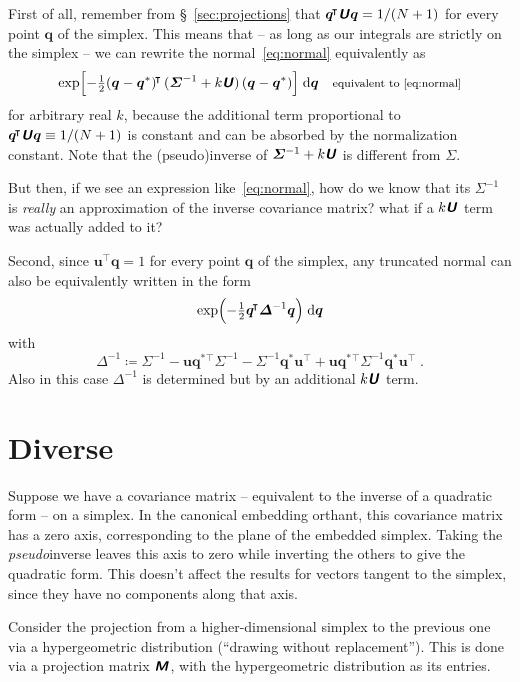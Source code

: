 \documentclass[\ifafour a4paper,12pt,\else a5paper,10pt,\fi%
onecolumn,oneside,article,%
british%
]{memoir}
\theoremstyle{remark}
\theoremstyle{innote}
\newcommand*{\mathte}[1]{\textbf{\textit{\textsf{#1}}}}
\newcommand*{\di}{\mathrm{d}}%
\newcommand*{\defd}{\coloneqq}
\renewcommand*{\|}[1][]{\nonscript\,#1\vert\nonscript\;\mathopen{}}
\newcommand*{\sect}{\S}%
\newcommand*{\T}{^{\mathord{\!\intercal}}}%
\newcommand*{\yq}{\bm{q}}
\newcommand*{\yu}{\bm{u}}
\newcommand*{\yuu}{\mathte{U}} %
\newcommand*{\ymm}{\mathte{M}}
\newcommand*{\yqr}{\yq^{*}}
\newcommand*{\ySigma}{\bm{\varSigma}}
\newcommand*{\yDelta}{\bm{\varDelta}}
\begin{document}
First of all, remember from \sect~\ref{sec:projections} that
$\yq\T \yuu\yq = 1/(N+1)$ for every point $\yq$ of the simplex. This means
that -- as long as our integrals are strictly on the simplex -- we can
rewrite the normal~\eqref{eq:normal} equivalently as
\begin{equation}
  \label{eq:normal_equivalent}
\exp\Bigl[-\tfrac{1}{2}
(\yq-\yqr)\T \, (\ySigma^{-1} + k\yuu)\, (\yq-\yqr)
\Bigr] \;\di\yq
\quad\text{\footnotesize equivalent to \eqref{eq:normal}}
\end{equation}
for arbitrary real $k$, because the additional term proportional to
$\yq\T \yuu \yq \equiv 1/(N+1)$ is constant and can be absorbed by the
normalization constant. Note that the (pseudo)inverse of
$\ySigma^{-1} + k\yuu$ is different from $\ySigma$.

But then, if we see an expression like~\eqref{eq:normal}, how do we know
that its $\ySigma^{-1}$ is \emph{really} an approximation of the inverse
covariance matrix? what if a $k\yuu$ term was actually added to it?

Second, since $\yu\T\yq = 1$ for every point $\yq$ of the simplex, any
truncated normal can also be equivalently written in the form
\begin{equation}
  \label{eq:normal_simple}
  \exp\Bigl(-\tfrac{1}{2}
\yq\T \yDelta^{-1} \yq
  \Bigr) \;\di\yq
\end{equation}
with
\begin{equation}
  \label{eq:delta_simple_normal}
  \yDelta^{-1} \defd \ySigma^{-1} - \yu\yqr{}\T\ySigma^{-1} - \ySigma^{-1}\yqr\yu\T
  + \yu\yqr{}\T\ySigma^{-1}\yqr\yu\T \;.
\end{equation}
Also in this case $\yDelta^{-1}$ is determined but by an additional $k\yuu$
term.

\section{Diverse}
\label{sec:diverse}

Suppose we have a covariance matrix -- equivalent to the inverse of a
quadratic form -- on a simplex. In the canonical embedding orthant, this
covariance matrix has a zero axis, corresponding to the plane of the
embedded simplex. Taking the \emph{pseudo}inverse leaves this axis to zero
while inverting the others to give the quadratic form. This doesn't affect
the results for vectors tangent to the simplex, since they have no
components along that axis.

Consider the projection from a higher-dimensional simplex to the previous
one via a hypergeometric distribution (\enquote{drawing without
  replacement}). This is done via a projection matrix $\ymm$, with the
hypergeometric distribution as its entries.
\end{document}
